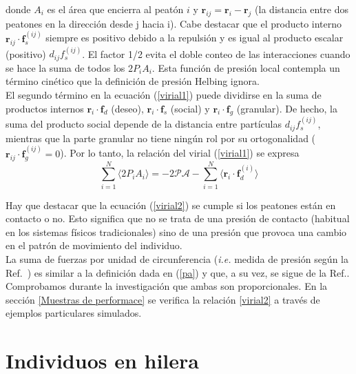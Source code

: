donde $A_i$ es el área que encierra al peatón $i$ y 
$\mathbf{r}_{ij}=\mathbf{r}_{i}-\mathbf{r}_j$ (la distancia
entre dos peatones en la dirección desde j hacia i). Cabe destacar que el producto interno $\mathbf{r}_{ij}\cdot\mathbf{f}_s^{(ij)}$ siempre es positivo debido a la repulsión y es igual al producto escalar (positivo) $d_{ij}f_s^{(ij)}$. El factor 1/2 evita el doble conteo de las interacciones cuando se hace la suma de todos los $2P_iA_i$. Esta función de presión local contempla un término cinético que la definición de presión Helbing ignora. \\ 

El segundo término en la ecuación (\ref{virial1}) puede dividirse en la suma de productos internos $\mathbf{r}_i\cdot\mathbf{f}_d$ (deseo), 
$\mathbf{r}_i\cdot\mathbf{f}_s$ (social) y $\mathbf{r}_i\cdot\mathbf{f}_g$ (granular). De hecho, la suma del producto social depende de la distancia entre partículas $d_{ij}f_s^{(ij)}$, mientras que la parte granular no tiene ningún rol por su ortogonalidad ($\mathbf{r}_{ij}\cdot\mathbf{f}_g^{(ij)}=0$). Por lo tanto, la relación del virial (\ref{virial1}) se expresa \\  

\begin{equation}
 \displaystyle\sum_{i=1}^N\langle2P_iA_i 
\rangle=-2\mathcal{PA} -\displaystyle\sum_{i=1}^N \langle
\mathbf{r}_i\cdot\mathbf{f}_d^{(i)}\rangle\label{virial2}
\end{equation}

Hay que destacar que la ecuación (\ref{virial2}) se cumple si los peatones están en contacto o no. Esto significa que no se trata de una presión de contacto (habitual en los sistemas físicos tradicionales) sino de una presión que provoca una cambio en el patrón de movimiento del individuo.\\

La suma de fuerzas por unidad de circunferencia (\textit{i.e.} medida de presión según la Ref.~\cite{Helbing1}) es similar a la definición dada en (\ref{pa}) y que, a su vez, se sigue de la Ref.\cite{lion}. Comprobamos durante la investigación que ambas son proporcionales. En la sección \ref{Muestras de performace} se verifica la relación \eqref{virial2} a través de ejemplos particulares simulados.\\   

\section{\label{social_pressure} Individuos en hilera}

